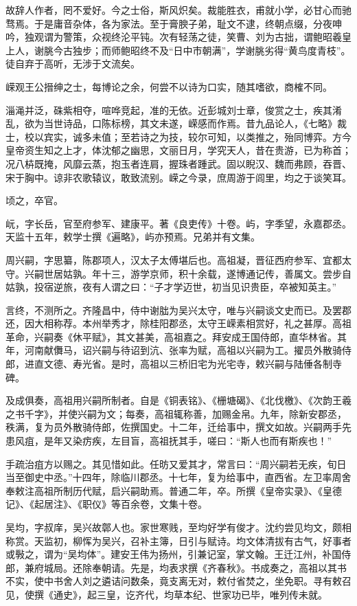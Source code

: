 \documentclass[12pt,UTF8]{ctexbook}
\begin{document}
故辞人作者，罔不爱好。今之士俗，斯风炽矣。裁能胜衣，甫就小学，必甘心而驰骛焉。于是庸音杂体，各为家法。至于膏腴子弟，耻文不逮，终朝点缀，分夜呻吟，独观谓为警策，众视终沦平钝。次有轻荡之徒，笑曹、刘为古拙，谓鲍昭羲皇上人，谢朓今古独步；而师鲍昭终不及“日中市朝满”，学谢朓劣得“黄鸟度青枝”。徒自弃于高听，无涉于文流矣。

嵘观王公搢绅之士，每博论之余，何尝不以诗为口实，随其嗜欲，商榷不同。

淄渑并泛，硃紫相夺，喧哗竞起，准的无依。近彭城刘士章，俊赏之士，疾其淆乱，欲为当世诗品，口陈标榜，其文未遂，嵘感而作焉。昔九品论人，《七略》裁士，校以宾实，诚多未值；至若诗之为技，较尔可知，以类推之，殆同博弈。方今皇帝资生知之上才，体沈郁之幽思，文丽日月，学究天人，昔在贵游，已为称首；况八枿既掩，风靡云蒸，抱玉者连肩，握珠者踵武。固以睨汉、魏而弗顾，吞晋、宋于胸中。谅非农歌辕议，敢致流别。嵘之今录，庶周游于闾里，均之于谈笑耳。

顷之，卒官。

岏，字长岳，官至府参军、建康平。著《良吏传》十卷。屿，字季望，永嘉郡丞。天监十五年，敕学士撰《遍略》，屿亦预焉。兄弟并有文集。

周兴嗣，字思纂，陈郡项人，汉太子太傅堪后也。高祖凝，晋征西府参军、宜都太守。兴嗣世居姑孰。年十三，游学京师，积十余载，遂博通记传，善属文。尝步自姑孰，投宿逆旅，夜有人谓之曰：“子才学迈世，初当见识贵臣，卒被知英主。”

言终，不测所之。齐隆昌中，侍中谢朏为吴兴太守，唯与兴嗣谈文史而已。及罢郡还，因大相称荐。本州举秀才，除桂阳郡丞，太守王嵘素相赏好，礼之甚厚。高祖革命，兴嗣奏《休平赋》，其文甚美，高祖嘉之。拜安成王国侍郎，直华林省。其年，河南献儛马，诏兴嗣与待诏到沆、张率为赋，高祖以兴嗣为工。擢员外散骑侍郎，进直文德、寿光省。是时，高祖以三桥旧宅为光宅寺，敕兴嗣与陆倕各制寺碑。

及成俱奏，高祖用兴嗣所制者。自是《铜表铭》、《栅塘碣》、《北伐檄》、《次韵王羲之书千字》，并使兴嗣为文；每奏，高祖辄称善，加赐金帛。九年，除新安郡丞，秩满，复为员外散骑侍郎，佐撰国史。十二年，迁给事中，撰文如故。兴嗣两手先患风疽，是年又染疠疾，左目盲，高祖抚其手，嗟曰：“斯人也而有斯疾也！”

手疏治疽方以赐之。其见惜如此。任昉又爱其才，常言曰：“周兴嗣若无疾，旬日当至御史中丞。”十四年，除临川郡丞。十七年，复为给事中，直西省。左卫率周舍奉敕注高祖所制历代赋，启兴嗣助焉。普通二年，卒。所撰《皇帝实录》、《皇德记》、《起居注》、《职仪》等百余卷，文集十卷。

吴均，字叔庠，吴兴故鄣人也。家世寒贱，至均好学有俊才。沈约尝见均文，颇相称赏。天监初，柳恽为吴兴，召补主簿，日引与赋诗。均文体清拔有古气，好事者或斅之，谓为“吴均体”。建安王伟为扬州，引兼记室，掌文翰。王迁江州，补国侍郎，兼府城局。还除奉朝请。先是，均表求撰《齐春秋》。书成奏之，高祖以其书不实，使中书舍人刘之遴诘问数条，竟支离无对，敕付省焚之，坐免职。寻有敕召见，使撰《通史》，起三皇，讫齐代，均草本纪、世家功已毕，唯列传未就。
\end{document}
